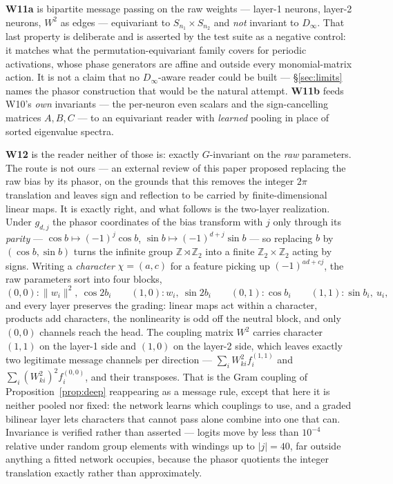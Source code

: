 \documentclass[10pt,letterpaper]{article}
\theoremstyle{definition}
\newcommand{\Z}{\mathbb{Z}}
\newcommand{\Dinf}{D_\infty}
\begin{document}
\textbf{W11a} is bipartite message passing on the raw weights --- layer-1 neurons, layer-2 neurons,
$W^2$ as edges --- equivariant to $S_{n_1}\times S_{n_2}$ and \emph{not} invariant to $\Dinf$. That
last property is deliberate and is asserted by the test suite as a negative control: it matches what
the permutation-equivariant family covers for periodic activations, whose phase generators are
affine and outside every monomial-matrix action. It is not a claim that no $\Dinf$-aware reader
could be built --- \S\ref{sec:limits} names the phasor construction that would be the natural
attempt. \textbf{W11b} feeds W10's \emph{own} invariants --- the
per-neuron even scalars and the sign-cancelling matrices $A, B, C$ --- to an equivariant reader with
\emph{learned} pooling in place of sorted eigenvalue spectra.

\textbf{W12} is the reader neither of those is: exactly $G$-invariant on the \emph{raw} parameters.
The route is not ours --- an external review of this paper proposed replacing the raw bias by its
phasor, on the grounds that this removes the integer $2\pi$ translation and leaves sign and
reflection to be carried by finite-dimensional linear maps. It is exactly right, and what follows is
the two-layer realization. Under $g_{d,j}$ the phasor coordinates of the bias transform with $j$
only through its \emph{parity} --- $\cos b \mapsto (-1)^j \cos b$, $\sin b \mapsto (-1)^{d+j}\sin b$ --- so replacing
$b$ by $(\cos b, \sin b)$ turns the infinite group $\Z\rtimes\Z_2$ into a finite $\Z_2\times\Z_2$
acting by signs. Writing a \emph{character} $\chi=(a,c)$ for a feature picking up $(-1)^{ad+cj}$,
the raw parameters sort into four blocks,
\[
(0,0)\!: \|w_i\|^2,\ \cos 2b_i \qquad (1,0)\!: w_i,\ \sin 2b_i \qquad
(0,1)\!: \cos b_i \qquad (1,1)\!: \sin b_i,\ u_i ,
\]
and every layer preserves the grading: linear maps act within a character, products add characters,
the nonlinearity is odd off the neutral block, and only $(0,0)$ channels reach the head. The
coupling matrix $W^2$ carries character $(1,1)$ on the layer-1 side and $(1,0)$ on the layer-2 side,
which leaves exactly two legitimate message channels per direction ---
$\sum_i W^2_{ki} f_i^{(1,1)}$ and $\sum_i (W^2_{ki})^2 f_i^{(0,0)}$, and their transposes. That is
the Gram coupling of Proposition~\ref{prop:deep} reappearing as a message rule, except that here it
is neither pooled nor fixed: the network learns which couplings to use, and a graded bilinear layer
lets characters that cannot pass alone combine into one that can. Invariance is verified rather than
asserted --- logits move by less than $10^{-4}$ relative under random group elements with windings
up to $|j| = 40$, far outside anything a fitted network occupies, because the phasor quotients the
integer translation exactly rather than approximately.
\end{document}
